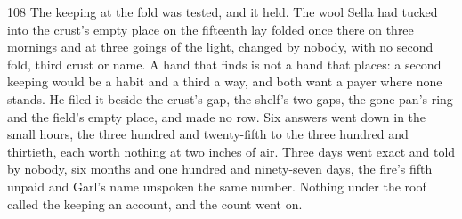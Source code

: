\begin{CRchronicle}{108}
The keeping at the fold was tested, and it held. The wool Sella had tucked into the crust’s empty place on the fifteenth lay folded once there on three mornings and at three goings of the light, changed by nobody, with no second fold, third crust or name. A hand that finds is not a hand that places: a second keeping would be a habit and a third a way, and both want a payer where none stands. He filed it beside the crust’s gap, the shelf’s two gaps, the gone pan’s ring and the field’s empty place, and made no row. Six answers went down in the small hours, the three hundred and twenty-fifth to the three hundred and thirtieth, each worth nothing at two inches of air. Three days went exact and told by nobody, six months and one hundred and ninety-seven days, the fire’s fifth unpaid and Garl’s name unspoken the same number. Nothing under the roof called the keeping an account, and the count went on.
\end{CRchronicle}
